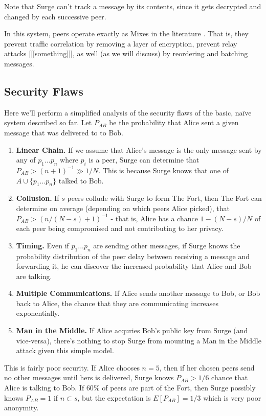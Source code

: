 \documentclass[twocolumn,11pt,english]{article}
\begin{document}
Note that Surge can't track a message by its contents, since it gets decrypted and changed by each successive peer. 

In this system, peers operate exactly as Mixes in the literature \cite{chaum-mix} . That is, they prevent traffic correlation by removing a layer of encryption, prevent relay attacks [[[something]]], as well (as we will discuss) by reordering and batching messages. 
\subsection{Security Flaws}
Here we'll perform a simplified analysis of the security flaws of the basic, na\"ive system described so far. 
Let $P_{AB}$ be the probability that Alice sent a given message that was delivered to to Bob. 
\begin{enumerate}
\item\textbf{Linear Chain.} If we assume that Alice's message is the only message sent by any of $p_1 \ldots p_n$ where $p_i$ is a peer, Surge can determine that $P_{AB} > (n+1)^{-1} \gg 1/N$. This is because Surge knows that one of $A \cup \{p_1 \ldots p_n\}$ talked to Bob.
\item\textbf{Collusion.} If $s$ peers collude with Surge to form The Fort, then The Fort can determine on average (depending on which peers Alice picked), that $P_{AB} > (n/(N-s)+1)^{-1}$ - that is, Alice has a chance $1 - (N-s)/N$ of each peer being compromised and not contributing to her privacy.
\item\textbf{Timing.} Even if $p_1 ... p_n$ are sending other messages, if Surge knows the probability distribution of the peer delay between receiving a message and forwarding it, he can discover the increased probability that Alice and Bob are talking. 
\item\textbf{Multiple Communications.} If Alice sends another message to Bob, or Bob back to Alice, the chance that they are communicating increases exponentially. 
\item\textbf{Man in the Middle.} If Alice acquries Bob's public key from Surge (and vice-versa), there's nothing to stop Surge from mounting a Man in the Middle attack given this simple model. 
\end{enumerate}
This is fairly poor security. If Alice chooses $n = 5$, then if her chosen peers send no other messages until hers is delivered, Surge knows $P_{AB} > 1/6$ chance that Alice is talking to Bob. If $60\%$ of peers are part of the Fort, then Surge possibly knows $P_{AB} = 1$ if $n \subset s$, but the expectation is $E[P_{AB}] = 1/3$ which is very poor anonymity.
\end{document}
